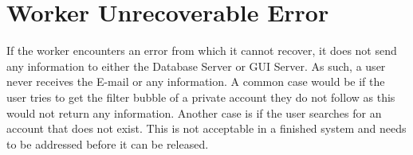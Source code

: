 \section*{Worker Unrecoverable Error}
If the worker encounters an error from which it cannot recover, it does not send
any information to either the Database Server or GUI Server. As such, a user
never receives the E-mail or any information. A common case would be if the user
tries to get the filter bubble of a private account they do not follow as this
would not return any information. Another case is if the user searches for an
account that does not exist. This is not acceptable in a finished system and
needs to be addressed before it can be released.

